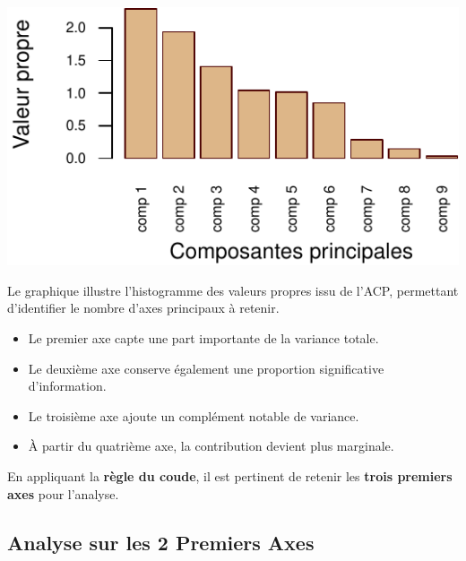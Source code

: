 \documentclass[
  12pt,
]{article}
\providecommand{\tightlist}{%
  \setlength{\itemsep}{0pt}\setlength{\parskip}{0pt}}
\begin{document}
\begin{center}\includegraphics{rmd_final_files/figure-latex/unnamed-chunk-27-1} \end{center}

Le graphique illustre l'histogramme des valeurs propres issu de l'ACP,
permettant d'identifier le nombre d'axes principaux à retenir.

\begin{itemize}
\tightlist
\item
  Le premier axe capte une part importante de la variance totale.
\item
  Le deuxième axe conserve également une proportion significative
  d'information.
\item
  Le troisième axe ajoute un complément notable de variance.
\item
  À partir du quatrième axe, la contribution devient plus marginale.
\end{itemize}

En appliquant la \textbf{règle du coude}, il est pertinent de retenir
les \textbf{trois premiers axes} pour l'analyse.

\subsection{Analyse sur les 2 Premiers
Axes}\label{analyse-sur-les-2-premiers-axes}
\end{document}
